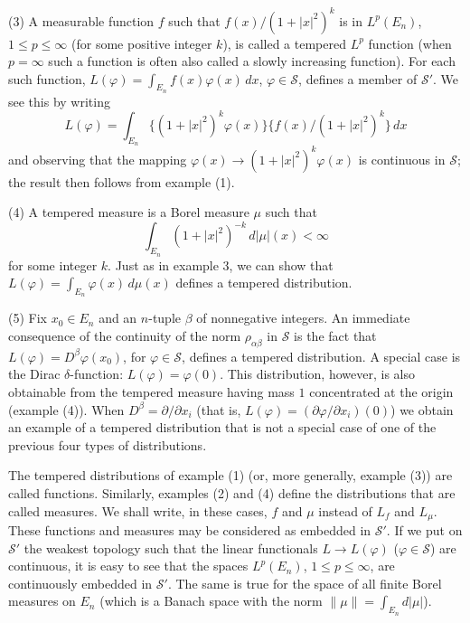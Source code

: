 \textup{(3)} A measurable function $f$ such that $f(x)/(1 + |x|^{2})^{k}$ is
in $L^{p}(E_{n})$, $1 \leq p \leq \infty$ (for some positive integer $k$), is
called a tempered $L^{p}$ function (when $p = \infty$ such a function is often
also called a slowly increasing function). For each such function,
$L(\varphi) = \int_{E_{n}} f(x)\varphi(x) \, dx$, $\varphi \in \mathscr{S}$,
defines a member of $\mathscr{S}'$. We see this by writing
\[
L(\varphi)=\int_{E_{n}}\{(1+|x|^{2})^{k}\varphi(x)\}\{f(x)/(1+|x|^{2})^{k}\}\,dx
\]
and observing that the mapping $\varphi(x) \to (1 + |x|^{2})^{k}\varphi(x)$ is
continuous in $\mathscr{S}$; the result then follows from example (1).

\textup{(4)} A tempered measure is a Borel measure $\mu$ such that
\[
\int_{E_{n}}(1+|x|^{2})^{-k}\,d|\mu|(x)<\infty
\]
for some integer $k$. Just as in example 3, we can show that
$L(\varphi) = \int_{E_{n}} \varphi(x) \, d\mu(x)$ defines a tempered
distribution.

\textup{(5)} Fix $x_{0} \in E_{n}$ and an $n$-tuple $\beta$ of nonnegative
integers. An immediate consequence of the continuity of the norm
$\rho_{\alpha\beta}$ in $\mathscr{S}$ is the fact that
$L(\varphi) = D^{\beta}\varphi(x_{0})$, for $\varphi \in \mathscr{S}$, defines
a tempered distribution. A special case is the Dirac $\delta$-function:
$L(\varphi) = \varphi(0)$. This distribution, however, is also obtainable from
the tempered measure having mass $1$ concentrated at the origin (example (4)).
When $D^{\beta} = \partial/\partial x_{i}$ (that is,
$L(\varphi) = (\partial\varphi/\partial x_{i})(0)$) we obtain an example of a
tempered distribution that is not a special case of one of the previous four
types of distributions.

The tempered distributions of example (1) (or, more generally, example (3))
are called functions. Similarly, examples (2) and (4) define the distributions
that are called measures. We shall write, in these cases, $f$ and $\mu$
instead of $L_{f}$ and $L_{\mu}$. These functions and measures may be
considered as embedded in $\mathscr{S}'$. If we put on $\mathscr{S}'$ the
weakest topology such that the linear functionals $L \to L(\varphi)$
($\varphi \in \mathscr{S}$) are continuous, it is easy to see that the spaces
$L^{p}(E_{n})$, $1 \leq p \leq \infty$, are continuously embedded in
$\mathscr{S}'$. The same is true for the space of all finite Borel measures on
$E_{n}$ (which is a Banach space with the norm $\|\mu\| = \int_{E_{n}} d|\mu|$).

